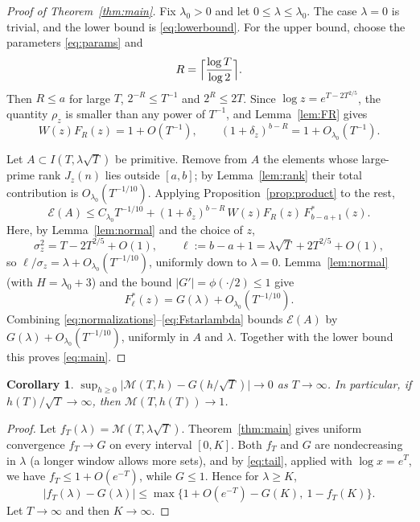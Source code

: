 \documentclass[11pt,a4paper]{article}
\numberwithin{equation}{section}
\theoremstyle{plain}
\newtheorem{corollary}[theorem]{Corollary}
\theoremstyle{definition}
\theoremstyle{remark}
\newcommand{\cE}{\mathcal{E}}
\newcommand{\cM}{\mathcal{M}}
\begin{document}
\begin{proof}[Proof of Theorem~\ref{thm:main}]
Fix $\lambda_0>0$ and let $0\le\lambda\le\lambda_0$. The case $\lambda=0$ is trivial, and the lower bound is \eqref{eq:lowerbound}. For the upper bound, choose the parameters \eqref{eq:params} and
\[
R=\Bigl\lceil\frac{\log T}{\log2}\Bigr\rceil .
\]
Then $R\le a$ for large $T$, $2^{-R}\le T^{-1}$ and $2^R\le2T$. Since $\log z=e^{T-2T^{2/5}}$, the quantity $\rho_z$ is smaller than any power of $T^{-1}$, and Lemma~\ref{lem:FR} gives
\begin{equation}\label{eq:normalizations}
W(z)F_R(z)=1+O(T^{-1}),\qquad(1+\delta_z)^{b-R}=1+O_{\lambda_0}(T^{-1}).
\end{equation}

Let $A\subset I(T,\lambda\sqrt T)$ be primitive. Remove from $A$ the elements whose large-prime rank $J_z(n)$ lies outside $[a,b]$; by Lemma~\ref{lem:rank} their total contribution is $O_{\lambda_0}(T^{-1/10})$. Applying Proposition~\ref{prop:product} to the rest,
\begin{equation}\label{eq:upper1}
\cE(A)\le C_{\lambda_0}T^{-1/10}+(1+\delta_z)^{b-R}\,W(z)F_R(z)\,F^*_{b-a+1}(z).
\end{equation}
Here, by Lemma~\ref{lem:normal} and the choice of $z$,
\[
\sigma_z^2=T-2T^{2/5}+O(1),\qquad\ell:=b-a+1=\lambda\sqrt T+2T^{2/5}+O(1),
\]
so $\ell/\sigma_z=\lambda+O_{\lambda_0}(T^{-1/10})$, uniformly down to $\lambda=0$. Lemma~\ref{lem:normal} (with $H=\lambda_0+3$) and the bound $|G'|=\phi(\cdot/2)\le1$ give
\begin{equation}\label{eq:Fstarlambda}
F^*_\ell(z)=G(\lambda)+O_{\lambda_0}(T^{-1/10}).
\end{equation}
Combining \eqref{eq:normalizations}--\eqref{eq:Fstarlambda} bounds $\cE(A)$ by $G(\lambda)+O_{\lambda_0}(T^{-1/10})$, uniformly in $A$ and $\lambda$. Together with the lower bound this proves \eqref{eq:main}.
\end{proof}

\begin{corollary}\label{cor:uniform}
$\sup_{h\ge0}\bigl|\cM(T,h)-G(h/\sqrt T)\bigr|\to0$ as $T\to\infty$. In particular, if $h(T)/\sqrt T\to\infty$, then $\cM(T,h(T))\to1$.
\end{corollary}

\begin{proof}
Let $f_T(\lambda)=\cM(T,\lambda\sqrt T)$. Theorem~\ref{thm:main} gives uniform convergence $f_T\to G$ on every interval $[0,K]$. Both $f_T$ and $G$ are nondecreasing in $\lambda$ (a longer window allows more sets), and by \eqref{eq:tail}, applied with $\log x=e^T$, we have $f_T\le1+O(e^{-T})$, while $G\le1$. Hence for $\lambda\ge K$,
\[
|f_T(\lambda)-G(\lambda)|\le\max\bigl\{1+O(e^{-T})-G(K),\ 1-f_T(K)\bigr\}.
\]
Let $T\to\infty$ and then $K\to\infty$.
\end{proof}
\end{document}
